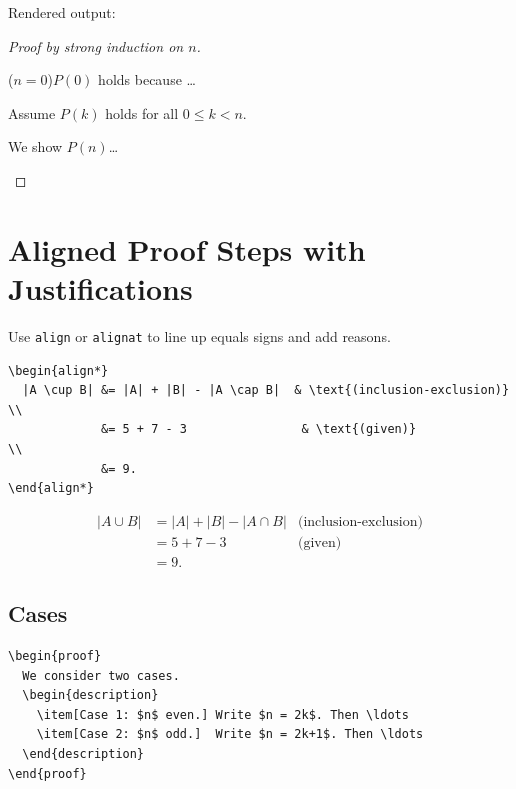 \documentclass[11pt]{article}
\begin{document}
Rendered output:

\begin{thmbox}
\begin{proof}[Proof by strong induction on $n$]
  \begin{description}[leftmargin=2cm, labelwidth=2cm]
    \item[Base case.] ($n = 0$)\quad $P(0)$ holds because \ldots
    \item[IH.] Assume $P(k)$ holds for all $0 \le k < n$.
    \item[IS.] We show $P(n)$\ldots \qedhere
  \end{description}
\end{proof}
\end{thmbox}

\section{Aligned Proof Steps with Justifications}

Use \texttt{align} or \texttt{alignat} to line up equals signs and add reasons.

\begin{lstlisting}
\begin{align*}
  |A \cup B| &= |A| + |B| - |A \cap B|  & \text{(inclusion-exclusion)}  \\
             &= 5 + 7 - 3                & \text{(given)}                \\
             &= 9.
\end{align*}
\end{lstlisting}

\begin{thmbox}
\begin{align*}
  |A \cup B| &= |A| + |B| - |A \cap B|  & \text{(inclusion-exclusion)}  \\
             &= 5 + 7 - 3                & \text{(given)}                \\
             &= 9.
\end{align*}
\end{thmbox}

\subsection{Cases}

\begin{lstlisting}
\begin{proof}
  We consider two cases.
  \begin{description}
    \item[Case 1: $n$ even.] Write $n = 2k$. Then \ldots
    \item[Case 2: $n$ odd.]  Write $n = 2k+1$. Then \ldots
  \end{description}
\end{proof}
\end{lstlisting}
\end{document}
